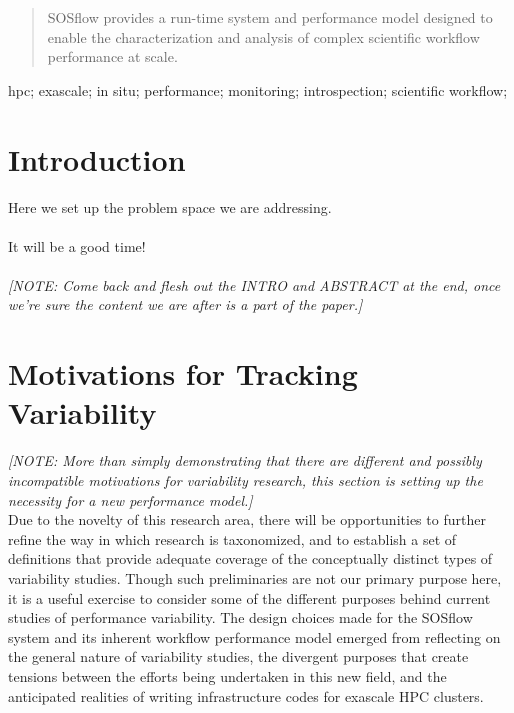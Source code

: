 \documentclass[10pt, conference, compsocconf]{IEEEtran}
\begin{document}




\maketitle


\begin{abstract}
SOSflow provides a run-time system and performance model designed to enable the 
characterization and analysis of complex scientific workflow performance at scale.


\end{abstract}

\begin{IEEEkeywords}
hpc; exascale; in situ; performance; monitoring; introspection; scientific 
workflow;

\end{IEEEkeywords}


%
\IEEEpeerreviewmaketitle


\section{Introduction}
Here we set up the problem space we are addressing.\\
\\
It will be a good time!\\
\\
\textit{[NOTE: Come back and flesh out the INTRO and ABSTRACT at the end, once 
we're sure the content we are after is a part of the paper.]}


\section{Motivations for Tracking Variability}
\textit{[NOTE: More than simply demonstrating that there are different and 
possibly incompatible motivations for variability research, this section is 
setting up the necessity for a new performance model.]}\\
Due to the novelty of this research area, there will be opportunities to 
further refine the way in which research is taxonomized, and to establish 
a set of definitions that provide adequate coverage of the conceptually distinct 
types of variability studies. Though such preliminaries are not our primary 
purpose here, it is a  useful  exercise to consider some of the different 
purposes behind current studies of performance variability. The design choices 
made for the SOSflow system and its inherent workflow performance model emerged 
from reflecting on the general nature of variability studies, the 
divergent purposes that create tensions between the efforts being 
undertaken in this new field, and the anticipated realities of writing 
infrastructure codes for exascale HPC clusters.
\end{document}
